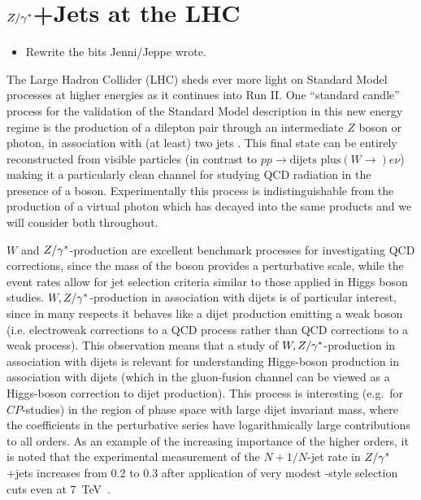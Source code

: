 \chapter{$Z/\gamma^*$+Jets at the LHC}
\label{chap:Zs}

	{\color{red}
	\begin{itemize}
		\item Rewrite the bits Jenni/Jeppe wrote.
	\end{itemize}
	}

	The Large Hadron Collider (LHC) sheds ever more light on Standard Model
	processes at higher energies as it continues into Run II.  One
	``standard candle'' process for the validation of  the
	Standard Model description in this new energy regime is the production of a
	dilepton pair through an intermediate $Z$ boson or photon, in
	association with (at least) two jets
	\cite{Chatrchyan:2011ne, Aad:2011qv,
	  Chatrchyan:2013tna, Aad:2013ysa, Khachatryan:2014zya, Aad:2014rta,
	  Khachatryan:2014dea}.  This final state can be entirely reconstructed from
	visible particles (in contrast to $pp\to \text{dijets plus}(W\to) e\nu$) making it a particularly
	clean channel for studying QCD radiation in the presence of a boson.
	Experimentally this process is indistinguishable from the production of a
	virtual photon which has decayed into the same products and we will consider
	both throughout.

	$W$ and $Z/\gamma^*$-production are excellent benchmark processes for investigating
	QCD corrections, since the mass of the boson provides a perturbative scale,
	while the event rates allow for jet selection criteria similar to those
	applied in Higgs boson studies. $W,Z/\gamma^*$-production in association with dijets
	is of particular interest, since in many respects it behaves like a dijet
	production emitting a weak boson (i.e. electroweak corrections to a QCD
	process rather than QCD corrections to a weak process). This observation
	means that a study of $W,Z/\gamma^*$-production in association with dijets is
	relevant for understanding Higgs-boson production in association with dijets
	(which in the gluon-fusion channel can be viewed as a Higgs-boson correction
	to dijet production). This process is interesting (e.g.~for $CP$-studies) in
	the region of phase space with large dijet invariant mass, where the
	coefficients in the perturbative series have logarithmically large
	contributions to all orders. As an example of the increasing importance of
	the higher orders, it is noted that the experimental measurement of the
	$N+1/N$-jet rate in $Z/\gamma^*$+jets increases from 0.2 to 0.3 after application of
	very modest \wbf-style selection cuts even at 7~TeV~\cite{Chatrchyan:2011ne,Aad:2011qv,Aad:2013ysa}.

